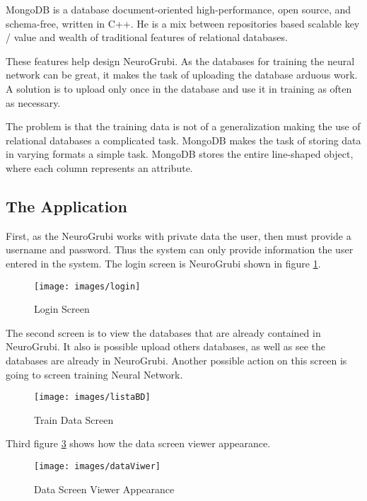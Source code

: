 MongoDB is a database document-oriented high-performance, open source, and 
schema-free, written in C++. He is a mix between repositories based scalable 
key / value and wealth of traditional features of relational databases.

These features help design NeuroGrubi. As the databases for training the neural 
network can be great, it makes the task of uploading the database arduous work. 
A solution is to upload only once in the database and use it in training as 
often as necessary.

The problem is that the training data is not of a generalization making the use 
of relational databases a complicated task. MongoDB makes the task of storing 
data in varying formats a simple task. MongoDB stores the entire line-shaped 
object, where each column represents an attribute.

\subsection{The Application}

First, as the NeuroGrubi works with private data the user, then must
provide a username and password. Thus the system can only provide
information the user entered in the system. The login screen is NeuroGrubi 
shown in figure \ref{fig:1}.

\begin{figure}[!htbp]
  \begin{center}
    \texttt{[image: images/login]}
    \caption{Login Screen}
    \label{fig:1}
  \end{center}
\end{figure}

The second screen is to view the databases that are already contained in 
NeuroGrubi. It also is possible upload others databases, as well as see the 
databases are already in NeuroGrubi. Another possible action on this screen is 
going to screen training Neural Network.

\begin{figure}[!htbp]
  \begin{center}
    \texttt{[image: images/listaBD]}
    \caption{Train Data Screen}
    \label{fig:2}
  \end{center}
\end{figure}

Third figure \ref{fig:3} shows how the data screen viewer appearance. 

\begin{figure}[!htbp]
  \begin{center}
    \texttt{[image: images/dataViwer]}
    \caption{Data Screen Viewer Appearance}
    \label{fig:3}
  \end{center}
\end{figure}

